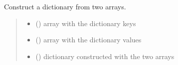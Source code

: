 \documentclass[letterpaper,10pt,english]{sphinxmanual}
\begin{document}

\begin{fulllineitems}
\label{\detokenize{01_utils:skinoptics.utils.dict_from_arrays}}
\pysigstartsignatures
{}
\pysigstopsignatures
\sphinxAtStartPar
Construct a dictionary from two arrays.
\begin{quote}\begin{description}
\begin{itemize}
\item {} 
\sphinxAtStartPar
{} () \textendash{} array with the dictionary keys

\item {} 
\sphinxAtStartPar
{} () \textendash{} array with the dictionary values

\end{itemize}

\sphinxAtStartPar
\begin{itemize}
\item {} 
\sphinxAtStartPar
{} () \textendash{} dictionary constructed with the two arrays

\end{itemize}


\end{description}\end{quote}

\end{fulllineitems}

\end{document}

